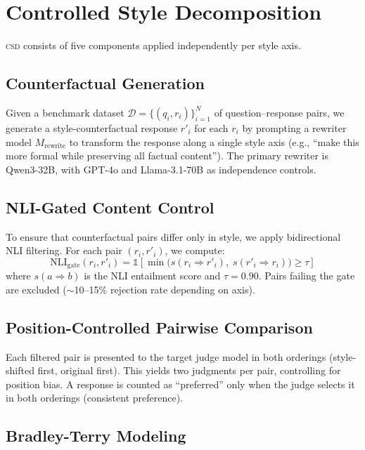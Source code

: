 \documentclass[11pt]{article}
\newcommand{\csd}{\textsc{csd}}
\begin{document}
\section{Controlled Style Decomposition}

\csd{} consists of five components applied independently per style axis.

\subsection{Counterfactual Generation}

Given a benchmark dataset $\mathcal{D} = \{(q_i, r_i)\}_{i=1}^N$ of question--response pairs, we generate a style-counterfactual response $r'_i$ for each $r_i$ by prompting a rewriter model $M_\text{rewrite}$ to transform the response along a single style axis (e.g., ``make this more formal while preserving all factual content'').
The primary rewriter is Qwen3-32B, with GPT-4o and Llama-3.1-70B as independence controls.

\subsection{NLI-Gated Content Control}

To ensure that counterfactual pairs differ only in style, we apply bidirectional NLI filtering.
For each pair $(r_i, r'_i)$, we compute:
\begin{equation}
\text{NLI}_\text{gate}(r_i, r'_i) = \mathbb{1}\left[\min\bigl(s(r_i \!\Rightarrow\! r'_i),\; s(r'_i \!\Rightarrow\! r_i)\bigr) \geq \tau\right]
\end{equation}
where $s(a \!\Rightarrow\! b)$ is the NLI entailment score and $\tau = 0.90$.
Pairs failing the gate are excluded (${\sim}$10--15\% rejection rate depending on axis).

\subsection{Position-Controlled Pairwise Comparison}

Each filtered pair is presented to the target judge model in both orderings (style-shifted first, original first).
This yields two judgments per pair, controlling for position bias.
A response is counted as ``preferred'' only when the judge selects it in both orderings (consistent preference).

\subsection{Bradley-Terry Modeling}
\end{document}
